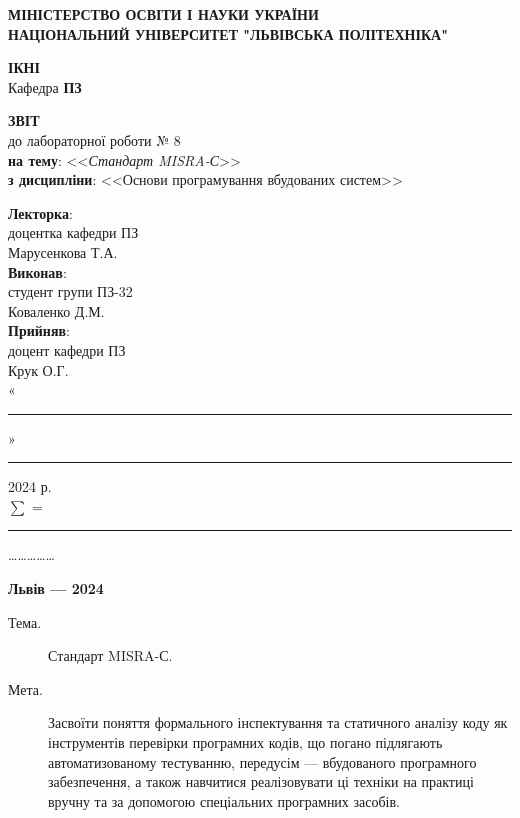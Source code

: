 \documentclass[oneside,14pt]{extarticle}
\newcommand\subject{Основи програмування вбудованих систем}
\newcommand\lecturer{доцентка кафедри ПЗ\\Марусенкова Т.А.}
\newcommand\teacher{доцент кафедри ПЗ\\Крук О.Г.}
\newcommand\mygroup{ПЗ-32}
\newcommand\lab{8}
\newcommand\theme{Стандарт MISRA-С}
\newcommand\purpose{Засвоїти поняття формального інспектування та
статичного аналізу коду як інструментів перевірки програмних кодів, що
погано підлягають автоматизованому тестуванню, передусім — вбудованого
програмного забезпечення, а також навчитися реалізовувати ці техніки на
практиці вручну та за допомогою спеціальних програмних засобів}
\begin{document}
\begin{normalsize}
	\begin{titlepage}
		\thispagestyle{empty}
		\begin{center}
			\textbf{МІНІСТЕРСТВО ОСВІТИ І НАУКИ УКРАЇНИ\\
				НАЦІОНАЛЬНИЙ УНІВЕРСИТЕТ "ЛЬВІВСЬКА ПОЛІТЕХНІКА"}
		\end{center}
		\begin{flushright}
			\textbf{ІКНІ}\\
			Кафедра \textbf{ПЗ}
		\end{flushright}
		\vspace{80pt}
		\begin{center}
			\textbf{ЗВІТ}\\
			\vspace{10pt}
			до лабораторної роботи № \lab\\
			\textbf{на тему}: <<\textit{\theme}>>\\
			\textbf{з дисципліни}: <<\subject>>
		\end{center}
		\vspace{80pt}
		\begin{flushright}
			
			\textbf{Лекторка}:\\
			\lecturer\\
			\vspace{28pt}
			\textbf{Виконав}:\\
			
			студент групи \mygroup\\
			Коваленко Д.М.\\
			\vspace{28pt}
			\textbf{Прийняв}:\\
			
			\teacher\\
			
			\vspace{28pt}
			«\rule{1cm}{0.15mm}» \rule{1.5cm}{0.15mm} 2024 р.\\
			$\sum$ = \rule{1cm}{0.15mm}……………\\
			
		\end{flushright}
		\vspace{\fill}
		\begin{center}
			\textbf{Львів — 2024}
		\end{center}
	\end{titlepage}
		
	\begin{description}
		\item[Тема.] \theme.
		\item[Мета.] \purpose.
	\end{description}


\end{normalsize}
\end{document}
